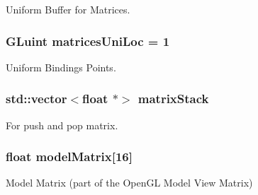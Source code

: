 Uniform Buffer for Matrices. 

\hypertarget{model_8cu_ac02c3eda5bd826029d27c463d16e2e9d}{
\subsubsection[{matrices\-Uni\-Loc}]{\setlength{\rightskip}{0pt plus 5cm}G\-Luint matrices\-Uni\-Loc = 1}}\label{model_8cu_ac02c3eda5bd826029d27c463d16e2e9d}


Uniform Bindings Points. 

\hypertarget{model_8cu_a2d79b97202d353b8484d554d4eec887a}{
\subsubsection[{matrix\-Stack}]{\setlength{\rightskip}{0pt plus 5cm}std\-::vector$<$float $\ast$$>$ matrix\-Stack}}\label{model_8cu_a2d79b97202d353b8484d554d4eec887a}


For push and pop matrix. 

\hypertarget{model_8cu_a3172941d9cdfe886976ac7aca79bdd38}{
\subsubsection[{model\-Matrix}]{\setlength{\rightskip}{0pt plus 5cm}float model\-Matrix\mbox{[}16\mbox{]}}}\label{model_8cu_a3172941d9cdfe886976ac7aca79bdd38}


Model Matrix (part of the Open\-G\-L Model View Matrix) 


